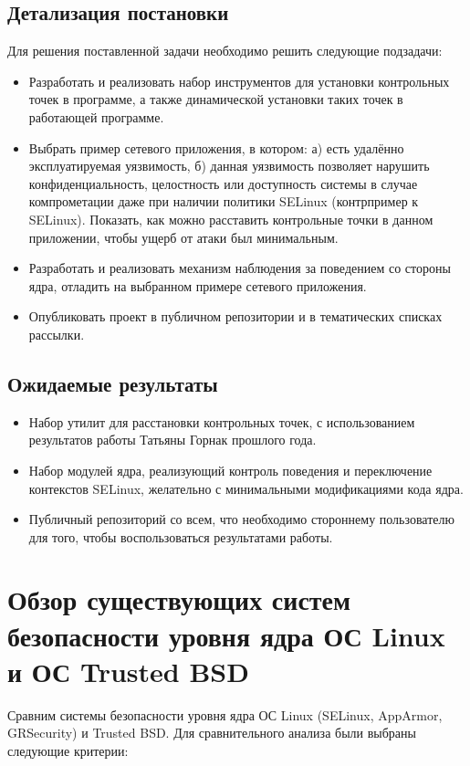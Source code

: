 \subsection{Детализация постановки}
Для решения поставленной задачи необходимо решить следующие подзадачи:
\begin{itemize}
\item Разработать и реализовать набор инструментов для установки
контрольных точек в программе, а также динамической установки таких
точек в работающей программе.
\item Выбрать пример сетевого приложения, в котором: а) есть удалённо
эксплуатируемая уязвимость, б) данная уязвимость позволяет нарушить
конфиденциальность, целостность или доступность системы в случае
компрометации даже при наличии политики SELinux (контрпример к SELinux).
Показать, как можно расставить контрольные точки в данном приложении,
чтобы ущерб от атаки был минимальным.
\item Разработать и реализовать механизм наблюдения за поведением со
стороны ядра, отладить на выбранном примере сетевого приложения.
\item Опубликовать проект в публичном репозитории и в тематических списках
рассылки.
\end{itemize}

\bigskip

\subsection{Ожидаемые результаты}
\begin{itemize}
\item Набор утилит для расстановки контрольных точек, с использованием
результатов работы Татьяны Горнак прошлого года.
\item Набор модулей ядра, реализующий контроль поведения и переключение
контекстов SELinux, желательно с минимальными модификациями кода ядра.
\item Публичный репозиторий со всем, что необходимо стороннему пользователю
для того, чтобы воспользоваться результатами работы.
\end{itemize}

\section{Обзор существующих систем безопасности 
    уровня ядра ОС Linux и ОС Trusted BSD}

\bigskip
Сравним системы безопасности уровня ядра ОС Linux
(SELinux, AppArmor, GRSecurity) и Trusted BSD. 
Для сравнительного анализа были выбраны следующие 
критерии:

